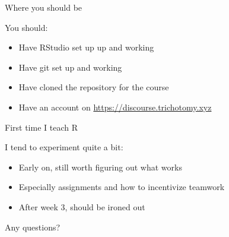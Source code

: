 \documentclass[
  ignorenonframetext,
]{beamer}
\providecommand{\tightlist}{%
  \setlength{\itemsep}{0pt}\setlength{\parskip}{0pt}}
\begin{document}
\begin{frame}{Where you should be}
\protect\hypertarget{where-you-should-be}{}

You should:

\begin{itemize}
\tightlist
\item
  Have RStudio set up up and working
\item
  Have git set up and working
\item
  Have cloned the repository for the course
\item
  Have an account on \url{https://discourse.trichotomy.xyz}
\end{itemize}

\end{frame}

\begin{frame}{First time I teach R}
\protect\hypertarget{first-time-i-teach-r}{}

I tend to experiment quite a bit:

\begin{itemize}
\tightlist
\item
  Early on, still worth figuring out what works
\item
  Especially assignments and how to incentivize teamwork
\item
  After week 3, should be ironed out
\end{itemize}

\pause{}

Any questions?

\end{frame}
\end{document}
